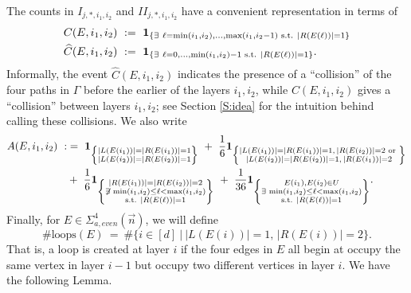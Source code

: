 \documentclass[11pt, reqno]{amsart}
\newcommand{\abs}[1]{\ensuremath{\left| #1 \right|}}
\newcommand{\set}[1]{\ensuremath{\{#1\}}}
\begin{document}
The counts in $I_{j,*,i_1,i_2}$ and $II_{j,*,i_1,i_2}$ have a convenient representation in terms of   
\begin{align}\label{E:C-def-E}
  C(E,i_1,i_2)~&:=~{\bf 1}_{\left\{\exists ~\ell=\min(i_1,i_2),\ldots, \max(i_1,i_2-1)\text{ s.t. } \abs{R(E(\ell))}=1\right\}}\\
  \widehat{C}(E,i_1,i_2)~&:=~{\bf 1}_{\left\{\exists ~\ell=0,\ldots, \min(i_1,i_2)-1\text{ s.t. } \abs{R(E(\ell))}=1\right\}}.\label{E:C-hat-def-E}
\end{align}
Informally, the event $\widehat{C}(E,i_1,i_2)$ indicates the presence of a ``collision'' of the four paths in $\Gamma$ before the earlier of the layers $i_1,i_2$, while $C(E,i_1,i_2)$ gives a ``collision'' between layers $i_1,i_2$; see Section \ref{S:idea} for the intuition behind calling these collisions. We also write
\begin{align}\label{E:A-def-2-E}
\notag A(E,i_1,i_2)~:&=~  {\bf 1}_{\left\{\substack{\abs{L(E(i_1))}=\abs{R(E(i_1))}=1 \\\abs{L(E(i_2))}=\abs{R(E(i_2))}=1}\right\}}~+~\frac{1}{6}{\bf 1}_{\left\{\substack{\abs{L(E(i_1))}=\abs{R(E(i_1))}=1,\, \abs{R(E(i_2))}=2\text{ or }\\\abs{L(E(i_2))}=\abs{R(E(i_2))}=1,\, \abs{R(E(i_1))}=2}\right\}}\\
~&+~\frac{1}{6}{\bf 1}_{\left\{\substack{\abs{R(E(i_1))}=\abs{R(E(i_2))}=2\\ \not\exists\,  \min(i_1,i_2)\leq \ell<\max(i_1,i_2)\\ \text{s.t. } \abs{R(E(\ell))}=1} \right\}}~+~\frac{1}{36}{\bf 1}_{\left\{\substack{E(i_1),E(i_2)\in U\\ \exists\, \min(i_1,i_2)\leq \ell<\max(i_1,i_2)\\ \text{s.t. } \abs{R(E(\ell))}=1} \right\}}.
\end{align}
Finally, for $E\in \Sigma_{a, even}^4(\vec{n})$, we will define 
\begin{equation}\label{E:loop-def}
\#\text{loops}(E)~=~\#\set{i\in [d]~|~\abs{L(E(i))}=1,\, \abs{R(E(i))}=2}.
\end{equation}
That is, a loop is created at layer $i$ if the four edges in $E$ all begin at occupy the same vertex in layer $i-1$ but occupy two different vertices in layer $i.$ We have the following Lemma. 
\end{document}

